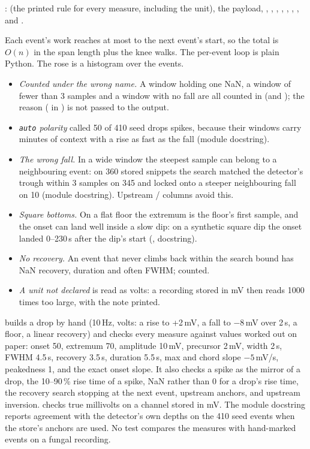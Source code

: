 :  (the printed rule for every measure, including the unit), the
 payload, , , ,
, , , ,  and
.

Each event's work reaches at most to the next event's start, so the total is $O(n)$ in the
span length plus the knee walks. The per-event loop is plain Python. The rose is a histogram
over the events.

\begin{itemize}
\item \emph{Counted under the wrong name.} A window holding one NaN, a window of fewer than
  3 samples and a window with no fall are all counted in  (and
  ); the reason ( in ) is not passed to the
  output.
\item \emph{\texttt{auto} polarity} called 50 of 410 seed drops spikes, because their windows
  carry minutes of context with a rise as fast as the fall (module docstring).
\item \emph{The wrong fall.} In a wide window the steepest sample can belong to a
  neighbouring event: on 360 stored snippets the search matched the detector's trough within
  3 samples on 345 and locked onto a steeper neighbouring fall on 10 (module docstring).
  Upstream / columns avoid this.
\item \emph{Square bottoms.} On a flat floor the extremum is the floor's first sample, and
  the onset can land well inside a slow dip: on a synthetic square dip the onset landed
  0--230\,s after the dip's start (,
  docstring).
\item \emph{No recovery.} An event that never climbs back within the search bound has NaN
  recovery, duration and often FWHM; counted.
\item \emph{A unit not declared} is read as volts: a recording stored in mV then reads
  1000 times too large, with the note printed.
\end{itemize}

 builds a drop by hand (10\,Hz, volts: a rise to
+2\,mV, a fall to $-8$\,mV over 2\,s, a floor, a linear recovery) and checks every measure
against values worked out on paper: onset 50, extremum 70, amplitude 10\,mV, precursor
2\,mV, width 2\,s, FWHM 4.5\,s, recovery 3.5\,s, duration 5.5\,s, max and chord slope
$-5$\,mV/s, peakedness 1, and the exact onset slope. It also checks a spike as the mirror of
a drop, the 10--90\,\% rise time of a spike, NaN rather than 0 for a drop's rise time, the
recovery search stopping at the next event, upstream anchors, and upstream inversion.
 checks true millivolts on a channel stored in mV.
The module docstring reports agreement with the detector's own depths on the 410 seed events
when the store's anchors are used. No test compares the measures with hand-marked events on a
fungal recording.

